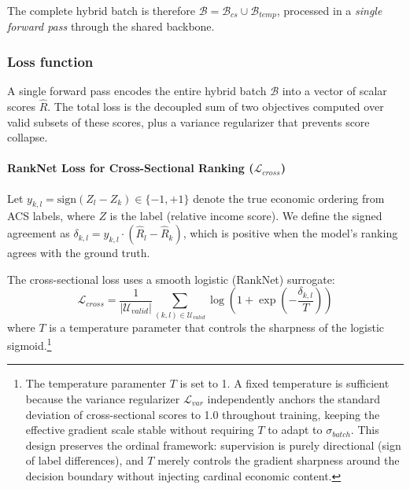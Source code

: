 \documentclass[conference]{IEEEtran}
\begin{document}
\noindent The complete hybrid batch is therefore $\mathcal{B} = \mathcal{B}_{cs} \cup \mathcal{B}_{temp}$, processed in a \textit{single forward pass} through the shared backbone.

\subsubsection{\textbf{Loss function}}

A single forward pass encodes the entire hybrid batch $\mathcal{B}$ into a vector of scalar scores $\hat{R}$. The total loss is the decoupled sum of two objectives computed over valid subsets of these scores, plus a variance regularizer that prevents score collapse.

\paragraph{RankNet Loss for Cross-Sectional Ranking ($\mathcal{L}_{cross}$)}


Let $y_{k,l} = \text{sign}(Z_l - Z_k) \in \{-1, +1\}$ denote the true economic ordering from ACS labels, where $Z$ is the label (relative income score). We define the signed agreement as $\delta_{k,l} = y_{k,l} \cdot (\hat{R}_l - \hat{R}_k)$, which is positive when the model's ranking agrees with the ground truth.

The cross-sectional loss uses a smooth logistic (RankNet) surrogate:
\begin{equation}
\mathcal{L}_{cross} = \frac{1}{|\mathcal{U}_{valid}|} \sum_{(k,l) \in \mathcal{U}_{valid}} \log\!\left(1 + \exp\!\left(-\frac{\delta_{k,l}}{T}\right)\right)
\end{equation}
where $T$ is a temperature parameter that controls the sharpness of the logistic sigmoid.\footnote{The temperature paramenter $T$ is set to 1. A fixed temperature is sufficient because the variance regularizer $\mathcal{L}_{var}$ independently anchors the standard deviation of cross-sectional scores to 1.0 throughout training, keeping the effective gradient scale stable without requiring $T$ to adapt to $\sigma_{batch}$. This design preserves the ordinal framework: supervision is purely directional (sign of label differences), and $T$ merely controls the gradient sharpness around the decision boundary without injecting cardinal economic content.}
\end{document}

